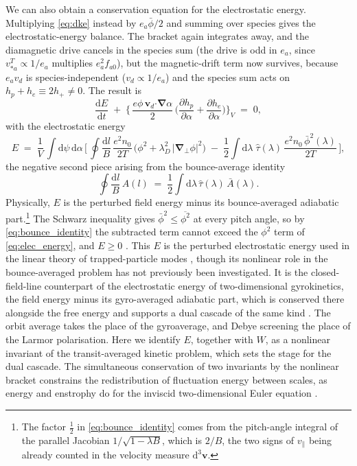 \documentclass{jpp}
\newcommand{\rmd}{\text{d}}
\newcommand{\bv}{\mathbf{v}}
\renewcommand{\vec}[1]{\boldsymbol{#1}}
\newcommand{\vec}[1]{\boldsymbol{#1}}
\providecommand{\bcdot}{\vec{\cdot}}
\newcommand{\grad}{{\vec{\nabla}}}
\newcommand{\vpar}{v_\parallel}
\newcommand{\lambdaD}{\lambda_D}
\begin{document}
We can also obtain a conservation equation for the electrostatic energy. Multiplying \cref{eq:dke} instead by $e_a\bar\phi/2$ and summing over species gives the electrostatic-energy balance. The bracket again integrates away, and the diamagnetic drive cancels in the species sum (the drive is odd in $e_a$, since $v_{*a}^T\propto 1/e_a$ multiplies $e_a^2 f_{a0}$), but the magnetic-drift term now survives, because $e_a v_d$ is species-independent ($v_d\propto1/e_a$) and the species sum acts on $h_p+h_e\equiv2h_+\neq0$. The result is
\begin{equation}\label{eq:E_balance}
\frac{\rmd E}{\rmd t} \;+\; \biggl\{\, \frac{e\phi\, \vec{v}_d\bcdot\grad\alpha}{2}\, \biggl(\frac{\partial h_p}{\partial \alpha} + \frac{\partial h_e}{\partial \alpha}\biggr) \biggr\}_{\!{\scriptscriptstyle V}} \;=\; 0,
\end{equation}
with the electrostatic energy
\begin{equation}\label{eq:elec_energy}
E \;=\; \frac{1}{V}\, \int \rmd\psi\, \rmd\alpha\, \biggl[\, \oint \frac{\rmd l}{B}\, \frac{e^2 n_0}{2 T}\, \bigl(\phi^2 + \lambdaD^2\, |\grad_\perp \phi|^2\bigr) \;-\; \frac{1}{2} \int \rmd\lambda\; \hat{\tau}(\lambda)\, \frac{e^2 n_0\, \bar{\phi}^2(\lambda)}{2 T}\, \biggr],
\end{equation}
the negative second piece arising from the bounce-average identity
\begin{equation}\label{eq:bounce_identity}
\oint\!\frac{\rmd l}{B}\,A(l) \;=\; \frac{1}{2}\int\!\rmd\lambda\, \hat\tau(\lambda)\,\bar A(\lambda) .
\end{equation}
Physically, $E$ is the perturbed field energy minus its bounce-averaged adiabatic part.\footnote{The factor $\tfrac12$ in \cref{eq:bounce_identity} comes from the pitch-angle integral of the parallel Jacobian $1/\sqrt{1-\lambda B}$, which is $2/B$, the two signs of $\vpar$ being already counted in the velocity measure $\rmd^3\bv$.} The Schwarz inequality gives $\bar\phi^2 \leq \overline{\phi^2}$ at every pitch angle, so by \cref{eq:bounce_identity} the subtracted term cannot exceed the $\phi^2$ term of \cref{eq:elec_energy}, and $E \geq 0$ \citep{Helander2013}. This $E$ is the perturbed electrostatic energy used in the linear theory of trapped-particle modes \citep{Proll2012, Helander2013}, though its nonlinear role in the bounce-averaged problem has not previously been investigated. It is the closed-field-line counterpart of the electrostatic energy of two-dimensional gyrokinetics, the field energy minus its gyro-averaged adiabatic part, which is conserved there alongside the free energy and supports a dual cascade of the same kind \citep{Plunk2010, PlunkTatsuno2011}. The orbit average takes the place of the gyroaverage, and Debye screening the place of the Larmor polarisation. Here we identify $E$, together with $W$, as a nonlinear invariant of the transit-averaged kinetic problem, which sets the stage for the dual cascade. The simultaneous conservation of two invariants by the nonlinear bracket constrains the redistribution of fluctuation energy between scales, as energy and enstrophy do for the inviscid two-dimensional Euler equation \citep{Fjortoft1953}.
\end{document}
